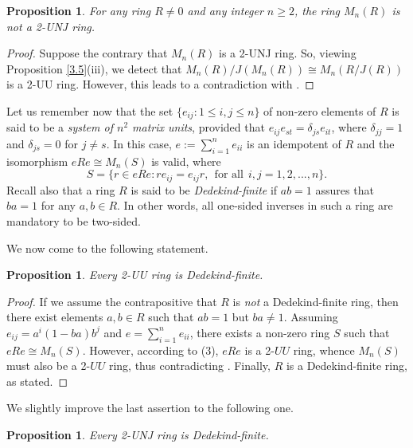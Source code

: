 \documentclass[12pt]{amsart}
\newtheorem{proposition}[theorem]{Proposition}
\theoremstyle{definition}
\begin{document}
\begin{proposition}\label{3.8}
For any ring \( R \neq 0 \) and any integer \( n \geq 2 \), the ring \( M_n(R) \) is not a 2-UNJ ring.
\end{proposition}

\begin{proof}
Suppose the contrary that \( M_n(R) \) is a 2-UNJ ring. So, viewing Proposition \ref{3.5}(iii), we detect that
\( M_n(R)/J(M_n(R)) \cong M_n(R/J(R)) \) is a 2-UU ring. However, this leads to a contradiction with \cite[Example 2.1]{10}.
\end{proof}

Let us remember now that the set $\{e_{ij} : 1 \le i, j \le n\}$ of non-zero elements of $R$ is said to be a {\it system of $n^2$ matrix units}, provided that $e_{ij}e_{st} = \delta_{js}e_{it}$, where $\delta_{jj} = 1$ and $\delta_{js} = 0$ for $j \neq s$. In this case, $e := \sum_{i=1}^{n} e_{ii}$ is an idempotent of $R$ and the isomorphism $eRe \cong M_n(S)$ is valid, where $$S = \{r \in eRe : re_{ij} = e_{ij}r,~~\textrm{for all}~~ i, j = 1, 2, . . . , n\}.$$
Recall also that a ring $R$ is said to be {\it Dedekind-finite} if $ab=1$ assures that $ba=1$ for any $a,b\in R$. In other words, all one-sided inverses in such a ring are mandatory to be two-sided.

\medskip

We now come to the following statement.

\begin{proposition}\label{3.29}
Every 2-UU ring is Dedekind-finite.
\end{proposition}

\begin{proof}
If we assume the contrapositive that $R$ is {\it not} a Dedekind-finite ring, then there exist elements $a, b \in R$ such that $ab = 1$ but $ba \neq 1$. Assuming $e_{ij} = a^i(1-ba)b^j$ and $e =\sum_{i=1}^{n}e_{ii}$, there exists a non-zero ring $S$ such that $eRe \cong M_n(S)$. However, according to \cite[Proposition 2.1]{10}(3), $eRe$ is a 2-$UU$ ring, whence $M_n(S)$ must also be a 2-$UU$ ring, thus contradicting \cite[Example 2.1]{10}. Finally, $R$ is a Dedekind-finite ring, as stated.
\end{proof}

We slightly improve the last assertion to the following one.

\begin{proposition}\label{3.28}
Every 2-UNJ ring is Dedekind-finite.
\end{proposition}
\end{document}
